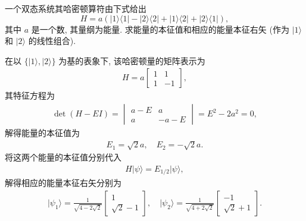 \documentclass{assignment}
\begin{document}
\begin{prob}[课本习题 1.10]
    一个双态系统其哈密顿算符由下式给出
    \[
        H=a(\lvert 1\rangle\langle 1\rvert-\lvert 2\rangle\langle 2\rvert+\lvert 1\rangle\langle 2\rvert+\lvert 2\rangle\langle 1\rvert),
    \]
    其中 $a$ 是一个数, 其量纲为能量. 求能量的本征值和相应的能量本征右矢 (作为 $\lvert 1\rangle$ 和 $\lvert 2\rangle$ 的线性组合).
\end{prob}
\begin{sol}
    在以 $\{\lvert 1\rangle,\lvert 2\rangle\}$ 为基的表象下, 该哈密顿量的矩阵表示为
    \begin{align}
        H=a\begin{bmatrix}
            1&1\\
            1&-1
        \end{bmatrix},
    \end{align}
    其特征方程为
    \begin{align}
        \det(H-EI)=\begin{vmatrix}
            a-E&a\\
            a&-a-E
        \end{vmatrix}=E^2-2a^2=0,
    \end{align}
    解得能量的本征值为
    \begin{align}
        E_1=\sqrt{2}a,\quad E_2=-\sqrt{2}a.
    \end{align}
    将这两个能量的本征值分别代入
    \begin{align}
        H\lvert\psi\rangle=E_{1/2}\lvert\psi\rangle,
    \end{align}
    解得相应的能量本征右矢分别为
    \begin{align}
        \lvert\psi_1\rangle=\frac{1}{\sqrt{4-2\sqrt{2}}}\begin{bmatrix}
            1\\
            \sqrt{2}-1
        \end{bmatrix},\quad\lvert\psi_2\rangle=\frac{1}{\sqrt{4+2\sqrt{2}}}\begin{bmatrix}
            -1\\
            \sqrt{2}+1
        \end{bmatrix}.
    \end{align}
\end{sol}
\end{document}
